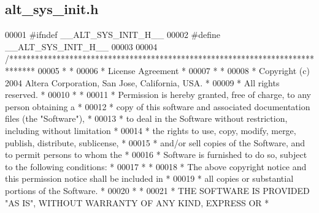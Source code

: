 \subsection{alt\+\_\+sys\+\_\+init.\+h}
\label{alt__sys__init_8h_source}

\begin{DoxyCode}
00001 \textcolor{preprocessor}{#ifndef \_\_ALT\_SYS\_INIT\_H\_\_}
00002 \textcolor{preprocessor}{#define \_\_ALT\_SYS\_INIT\_H\_\_}
00003 
00004 \textcolor{comment}{/******************************************************************************}
00005 \textcolor{comment}{*                                                                             *}
00006 \textcolor{comment}{* License Agreement                                                           *}
00007 \textcolor{comment}{*                                                                             *}
00008 \textcolor{comment}{* Copyright (c) 2004 Altera Corporation, San Jose, California, USA.           *}
00009 \textcolor{comment}{* All rights reserved.                                                        *}
00010 \textcolor{comment}{*                                                                             *}
00011 \textcolor{comment}{* Permission is hereby granted, free of charge, to any person obtaining a     *}
00012 \textcolor{comment}{* copy of this software and associated documentation files (the "Software"),  *}
00013 \textcolor{comment}{* to deal in the Software without restriction, including without limitation   *}
00014 \textcolor{comment}{* the rights to use, copy, modify, merge, publish, distribute, sublicense,    *}
00015 \textcolor{comment}{* and/or sell copies of the Software, and to permit persons to whom the       *}
00016 \textcolor{comment}{* Software is furnished to do so, subject to the following conditions:        *}
00017 \textcolor{comment}{*                                                                             *}
00018 \textcolor{comment}{* The above copyright notice and this permission notice shall be included in  *}
00019 \textcolor{comment}{* all copies or substantial portions of the Software.                         *}
00020 \textcolor{comment}{*                                                                             *}
00021 \textcolor{comment}{* THE SOFTWARE IS PROVIDED "AS IS", WITHOUT WARRANTY OF ANY KIND, EXPRESS OR  *}

\end{DoxyCode}
